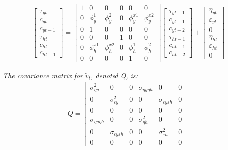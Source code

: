\documentclass[
  12pt,
]{article}
\begin{document}
        \begin{align}
        \begin{bmatrix}
        \tau_{yt}   \\
        c_{yt}      \\
        c_{yt-1}        \\
        \tau_{ht}   \\
        c_{ht}      \\
        c_{ht-1}        
        \end{bmatrix}
        =
        \begin{bmatrix}
        1   & 0 & 0 & 0 & 0 & 0 \\
        0   & \phi^1_y  & \phi^2_y  & 0 & \phi^{x1}_y   & \phi^{x2}_y   \\
        0   & 1 & 0 & 0 & 0 & 0  \\
        0   & 0 & 0 & 1 & 0 & 0 \\
        0   & \phi^{x1}_h   & \phi^{x2}_h   & 0 &\phi^1_h   & \phi^2_h  \\
        0   & 0 & 0 & 0 & 1 & 0
        \end{bmatrix}
        \begin{bmatrix}
        \tau_{yt-1} \\
        c_{yt-1}        \\
        c_{yt-2}        \\
        \tau_{ht-1} \\
        c_{ht-1}        \\
        c_{ht-2}        
        \end{bmatrix}
        +
        \begin{bmatrix}
        \eta_{yt}   \\
        \varepsilon_{yt}        \\
        0   \\
        \eta_{ht}   \\
        \varepsilon_{ht}        \\
        0   
        \end{bmatrix}
        \end{align}
        
        \bigskip
        \textit{The covariance matrix for $\tilde{v}_t$, denoted Q, is: }
        \begin{align}
        Q = 
        \begin{bmatrix}
        \sigma^2_{\eta y}   & 0  &0 & \sigma_{\eta y \eta h}    & 0 & 0 \\
        0   & \sigma^2_{\varepsilon y}  & 0 & 0 & \sigma_{\varepsilon y \varepsilon h}  & 0 \\
        0   &   0   & 0 & 0 & 0 & 0 \\
        \sigma_{\eta y \eta h}  & 0 & 0 & \sigma^2_{\eta h} & 0 & 0 \\
        0   & \sigma_{\varepsilon y \varepsilon h}  & 0 & 0 & \sigma^2_{\varepsilon h}      & 0 \\
        0   &0  & 0 & 0
        & 0 & 0
        \end{bmatrix}
        \end{align}
        
\end{document}
